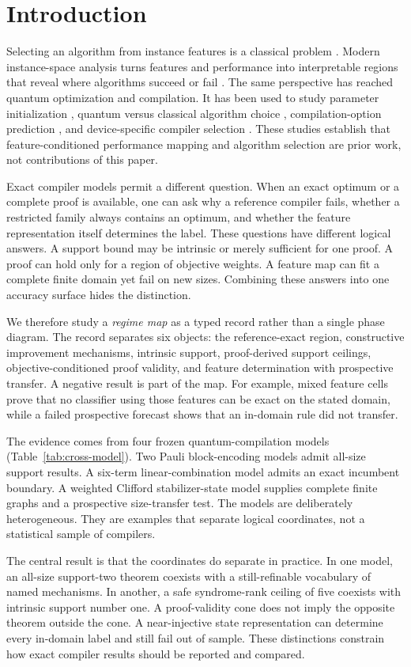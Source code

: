 \section{Introduction}

Selecting an algorithm from instance features is a classical problem \cite{rice1976algorithm}.  Modern instance-space analysis turns features and performance into interpretable regions that reveal where algorithms succeed or fail \cite{smithmiles2009meta,smithmiles2023isa}.  The same perspective has reached quantum optimization and compilation.  It has been used to study parameter initialization \cite{katial2025qaoa}, quantum versus classical algorithm choice \cite{moussa2020selection}, compilation-option prediction \cite{quetschlich2023options}, and device-specific compiler selection \cite{quetschlich2025predictor}.  These studies establish that feature-conditioned performance mapping and algorithm selection are prior work, not contributions of this paper.

Exact compiler models permit a different question.  When an exact optimum or a complete proof is available, one can ask why a reference compiler fails, whether a restricted family always contains an optimum, and whether the feature representation itself determines the label.  These questions have different logical answers.  A support bound may be intrinsic or merely sufficient for one proof.  A proof can hold only for a region of objective weights.  A feature map can fit a complete finite domain yet fail on new sizes.  Combining these answers into one accuracy surface hides the distinction.

We therefore study a \emph{regime map} as a typed record rather than a single phase diagram.  The record separates six objects: the reference-exact region, constructive improvement mechanisms, intrinsic support, proof-derived support ceilings, objective-conditioned proof validity, and feature determination with prospective transfer.  A negative result is part of the map.  For example, mixed feature cells prove that no classifier using those features can be exact on the stated domain, while a failed prospective forecast shows that an in-domain rule did not transfer.

The evidence comes from four frozen quantum-compilation models (Table~\ref{tab:cross-model}).  Two Pauli block-encoding models admit all-size support results.  A six-term linear-combination model admits an exact incumbent boundary.  A weighted Clifford stabilizer-state model supplies complete finite graphs and a prospective size-transfer test.  The models are deliberately heterogeneous.  They are examples that separate logical coordinates, not a statistical sample of compilers.

The central result is that the coordinates do separate in practice.  In one model, an all-size support-two theorem coexists with a still-refinable vocabulary of named mechanisms.  In another, a safe syndrome-rank ceiling of five coexists with intrinsic support number one.  A proof-validity cone does not imply the opposite theorem outside the cone.  A near-injective state representation can determine every in-domain label and still fail out of sample.  These distinctions constrain how exact compiler results should be reported and compared.
